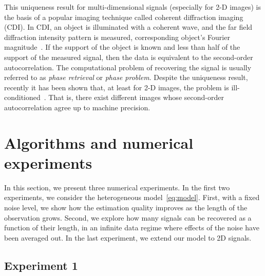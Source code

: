 \documentclass[12pt]{article}
\newcommand{\1}{\mathbf{1}}
\theoremstyle{plain}
\theoremstyle{definition}
\theoremstyle{remark}
\theoremstyle{plain}
\theoremstyle{remark}
\theoremstyle{plain}
\theoremstyle{plain}
\theoremstyle{plain}
\numberwithin{equation}{section}
\begin{document}
This uniqueness result for multi-dimensional signals (especially for 2-D images) is the basis of a popular imaging technique called coherent diffraction imaging (CDI). In CDI, an object is
illuminated with a coherent wave, and the far field diffraction
intensity pattern  is measured, corresponding object's Fourier magnitude~\cite{miao1999extending,shechtman2015phase}. 
If the support of the object is known and less than half of the support of the measured signal, then the data is equivalent to the second-order autocorrelation. The computational problem of recovering the signal is usually referred to as \emph{phase retrieval} or \emph{phase problem}.
Despite the uniqueness result, recently it has been shown that, at least for 2-D images, the problem is  ill-conditioned~\cite{barnett2018geometry}. That is, there exist different images whose second-order autocorrelation agree up to machine precision. 



\section{Algorithms and numerical experiments} \label{sec:numerics}



In this section, we present three numerical experiments. In the first two experiments, we consider the heterogeneous model~\eqref{eq:model}. First, with a fixed noise level, we show how the estimation quality improves as the length of the observation grows. Second, we explore how many signals can be recovered as a function of their length, in an infinite data regime where effects of the noise have been averaged out. In the last experiment, we extend our model to 2D signals.

\subsection{Experiment 1} \label{sec:XP1}
\end{document}
